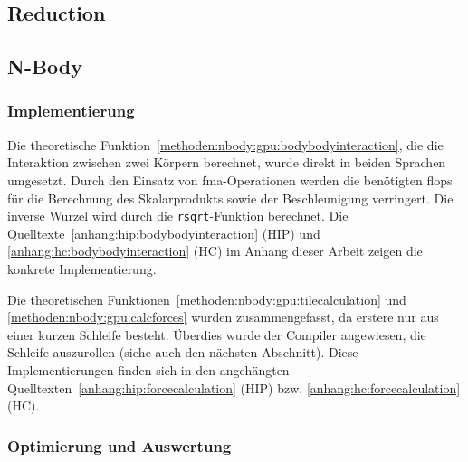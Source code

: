 \subsection{Reduction}

\subsection{N-Body}

\subsubsection{Implementierung}

Die theoretische Funktion~\ref{methoden:nbody:gpu:bodybodyinteraction}, die die
Interaktion zwischen zwei Körpern berechnet, wurde direkt in beiden Sprachen
umgesetzt. Durch den Einsatz von \gls{fma}-Operationen werden die benötigten
\gls{flops} für die Berechnung des Skalarprodukts sowie der Beschleunigung
verringert. Die inverse Wurzel wird durch die \texttt{rsqrt}-Funktion berechnet.
Die Quelltexte~\ref{anhang:hip:bodybodyinteraction} (HIP) und
\ref{anhang:hc:bodybodyinteraction} (HC) im Anhang dieser Arbeit zeigen die
konkrete Implementierung.

Die theoretischen Funktionen~\ref{methoden:nbody:gpu:tilecalculation} und
\ref{methoden:nbody:gpu:calcforces} wurden zusammengefasst, da erstere
nur aus einer kurzen Schleife besteht. Überdies wurde der Compiler angewiesen,
die Schleife auszurollen (siehe auch den nächsten Abschnitt). Diese
Implementierungen finden sich in den angehängten
Quelltexten~\ref{anhang:hip:forcecalculation} (HIP) bzw.
\ref{anhang:hc:forcecalculation} (HC).

\subsubsection{Optimierung und Auswertung}
